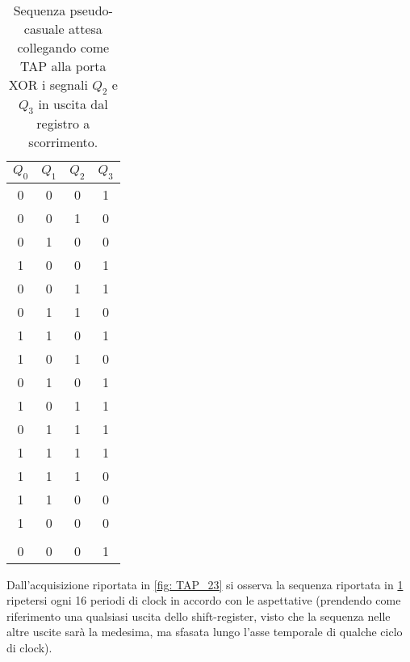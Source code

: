 \documentclass[10pt, a4paper, italian]{article}
\begin{document}
\begin{table}[htbp]
\centering
\begin{tabular}{cccc}
\toprule
$Q_0$ & $Q_1$ & $Q_2$ & $Q_3$ \\
\midrule
\midrule
0 & 0 & 0 & 1 \\
0 & 0 & 1 & 0 \\
0 & 1 & 0 & 0 \\
1 & 0 & 0 & 1 \\
0 & 0 & 1 & 1 \\
0 & 1 & 1 & 0 \\
1 & 1 & 0 & 1 \\
1 & 0 & 1 & 0 \\
0 & 1 & 0 & 1 \\
1 & 0 & 1 & 1 \\
0 & 1 & 1 & 1 \\
1 & 1 & 1 & 1 \\
1 & 1 & 1 & 0 \\
1 & 1 & 0 & 0 \\
1 & 0 & 0 & 0 \\
\\
0 & 0 & 0 & 1 \\
\bottomrule
\end{tabular}
\caption{Sequenza pseudo-casuale attesa collegando come TAP alla porta XOR i
segnali $Q_2$ e $Q_3$ in uscita dal registro a scorrimento.
\label{tab: pseudo}}
\end{table}

Dall'acquisizione riportata in \cref{fig: TAP_23} si osserva la sequenza
riportata in \cref{tab: pseudo} ripetersi ogni 16 periodi di clock in accordo
con le aspettative (prendendo come riferimento una qualsiasi uscita dello
shift-register, visto che la sequenza nelle altre uscite sarà la medesima, ma
sfasata lungo l'asse temporale di qualche ciclo di clock).
\end{document}
